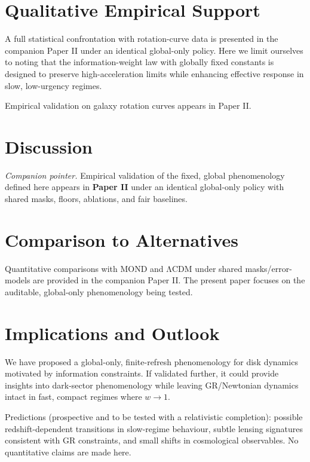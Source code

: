 \documentclass[usenatbib]{mnras}
\begin{document}
\section{Qualitative Empirical Support}
\label{sec:qualitative}

A full statistical confrontation with rotation-curve data is presented in the companion Paper II under an identical global-only policy. Here we limit ourselves to noting that the information-weight law with globally fixed constants is designed to preserve high-acceleration limits while enhancing effective response in slow, low-urgency regimes.

Empirical validation on galaxy rotation curves appears in Paper II.

\section{Discussion}

\noindent\textit{Companion pointer.} Empirical validation of the fixed, global phenomenology defined here appears in \textbf{Paper II} under an identical global-only policy with shared masks, floors, ablations, and fair baselines.

\section{Comparison to Alternatives}

Quantitative comparisons with MOND and ΛCDM under shared masks/error-models are provided in the companion Paper II. The present paper focuses on the auditable, global-only phenomenology being tested.

\section{Implications and Outlook}
\label{sec:conclusion}

We have proposed a global-only, finite-refresh phenomenology for disk dynamics motivated by information constraints. If validated further, it could provide insights into dark-sector phenomenology while leaving GR/Newtonian dynamics intact in fast, compact regimes where $w\to 1$.

Predictions (prospective and to be tested with a relativistic completion): possible redshift-dependent transitions in slow-regime behaviour, subtle lensing signatures consistent with GR constraints, and small shifts in cosmological observables. No quantitative claims are made here.
\end{document}
